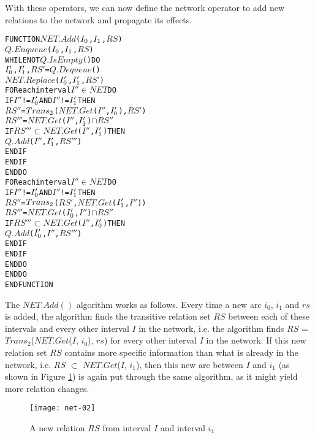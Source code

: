 \documentclass[11pt]{report}
\newenvironment{vverbatim}
{
  \begin{alltt}
}
{
  \vspace{-\baselineskip}
  \end{alltt}
}
\begin{document}
          With these operators, we can now define the network operator to add new
          relations to the network and propagate its effects.

          \begin{vverbatim}
  FUNCTION \(NET.Add\)(\(I\sb{0}\), \(I\sb{1}\), \(RS\))
    \(Q.Enqueue\)(\(I\sb{0}\), \(I\sb{1}\), \(RS\))
    WHILE NOT \(Q.IsEmpty\)() DO
      \(I\sb{0}'\), \(I\sb{1}'\), \(RS'\) = \(Q.Dequeue\)()
      \(NET.Replace\)(\(I\sb{0}'\), \(I\sb{1}'\), \(RS'\)) 
      FOR each interval \(I''\) \(\in\) \(NET\) DO
        IF \(I''\) != \(I\sb{0}'\) AND \(I''\) != \(I\sb{1}'\) THEN
          \(RS''\) =  \(Trans\sb{2}\)(\(NET.Get\)(\(I''\), \(I\sb{0}'\)), \(RS'\)) 
          \(RS'''\) = \(NET.Get\)(\(I''\), \(I\sb{1}'\)) \(\cap\) \(RS''\)
          IF \(RS'''\) \(\subset\) \(NET.Get\)(\(I''\), \(I\sb{1}'\)) THEN
            \(Q.Add\)(\(I''\), \(I\sb{1}'\), \(RS'''\))
          ENDIF 
        ENDIF
      ENDDO
      FOR each interval \(I''\) \(\in\) \(NET\) DO
        IF \(I''\) != \(I\sb{0}'\) AND \(I''\) != \(I\sb{1}'\) THEN
          \(RS''\) =  \(Trans\sb{2}\)(\(RS'\), \(NET.Get\)(\(I\sb{1}'\), \(I''\)))
          \(RS'''\) = \(NET.Get\)(\(I\sb{0}'\), \(I''\)) \(\cap\) \(RS''\)
          IF \(RS'''\) \(\subset\) \(NET.Get\)(\(I''\), \(I\sb{0}'\)) THEN
            \(Q.Add\)(\(I\sb{0}'\), \(I''\), \(RS'''\))
          ENDIF 
        ENDIF
      ENDDO
    ENDDO
  ENDFUNCTION
          \end{vverbatim}

          The $NET.Add()$ algorithm works as follows. Every time a new arc
          $i_0$, $i_1$ and $rs$ is added, the algorithm finds the transitive
          relation set $RS$ between each of these intervals and every other
          interval $I$ in the network, i.e. the algorithm finds $RS$ =
          $Trans_2$($NET.Get$($I$, $i_0$), $rs$) for every other interval $I$
          in the network. If this new relation set $RS$ contains more specific
          information than what is already in the network, i.e. $RS$ $\subset$
          $NET.Get$($I$, $i_1$), then this new arc between $I$ and $i_1$ (as
          shown in Figure \ref{fig-net-ex-02}) is again put through the same
          algorithm, as it might yield more relation changes.

          \begin{figure}[[tbhp]
            \begin{center}
              \texttt{[image: net-02]}
              \caption{A new relation $RS$ from interval $I$ and interval $i_1$}
              \label{fig-net-ex-02}
            \end{center}
          \end{figure}
\end{document}
